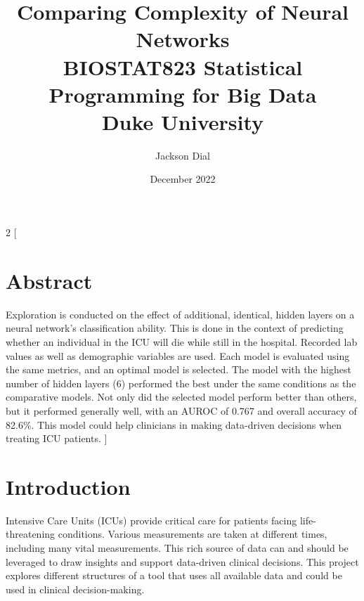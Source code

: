 \documentclass{article}
\title{%
  Comparing Complexity of Neural Networks \\
  \large BIOSTAT823  Statistical Programming for Big Data \\
    Duke University}
\author{Jackson Dial}
\date{December 2022}
\begin{document}
\maketitle

\begin{multicols}{2}
[
\section{Abstract}
{\small Exploration is conducted on the effect of additional, identical, hidden layers on a neural network’s classification ability. This is done in the context of predicting whether an individual in the ICU will die while still in the hospital. Recorded lab values as well as demographic variables are used. Each model is evaluated using the same metrics, and an optimal model is selected. The model with the highest number of hidden layers (6) performed the best under the same conditions as the comparative models. Not only did the selected model perform better than others, but it performed generally well, with an AUROC of 0.767 and overall accuracy of 82.6\%. This model could help clinicians in making data-driven decisions when treating ICU patients. }
]

\section{Introduction}
Intensive Care Units (ICUs) provide critical care for patients facing life-threatening conditions. Various measurements are taken at different times, including many vital measurements. This rich source of data can and should be leveraged to draw insights and support data-driven clinical decisions. This project explores different structures of a tool that uses all available data and could be used in clinical decision-making.


\end{multicols}
\end{document}
